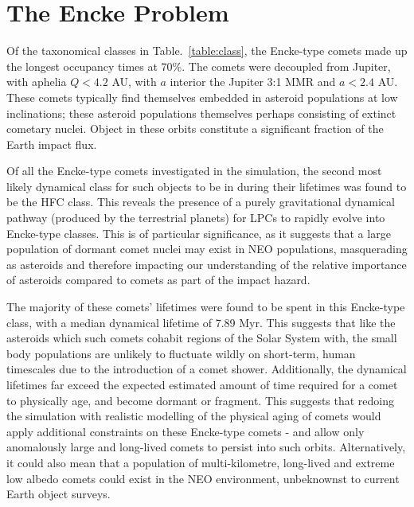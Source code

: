 \section{The Encke Problem}

Of the taxonomical classes in Table.~\ref{table:class}, the Encke-type comets made up the longest occupancy times at 70\%. The comets were decoupled from Jupiter, with aphelia $Q < 4.2$ AU, with $a$ interior the Jupiter 3:1 MMR and $a < 2.4$ AU. These comets typically find themselves embedded in asteroid populations at low inclinations; these asteroid populations themselves perhaps consisting of extinct cometary nuclei. Object in these orbits constitute a significant fraction of the Earth impact flux.

Of all the Encke-type comets investigated in the simulation, the second most likely dynamical class for such objects to be in during their lifetimes was found to be the HFC class. This reveals the presence of a purely gravitational dynamical pathway (produced by the terrestrial planets) for LPCs to rapidly evolve into Encke-type classes. This is of particular significance, as it suggests that a large population of dormant comet nuclei may exist in NEO populations, masquerading as asteroids and therefore impacting our understanding  of  the  relative  importance  of  asteroids  compared to comets as part of the impact hazard.

The majority of these comets' lifetimes were found to be spent in this Encke-type class, with a median dynamical lifetime of 7.89 Myr. This suggests that like the asteroids which such comets cohabit regions of the Solar System with, the small body populations are unlikely to fluctuate wildly on short-term, human timescales due to the introduction of a comet shower. Additionally, the dynamical lifetimes far exceed the expected estimated amount of time required for a comet to physically age, and become dormant or fragment. This suggests that redoing the simulation with realistic modelling of the physical aging of comets would apply additional constraints on these Encke-type comets -  and allow only anomalously large and long-lived comets to persist into such orbits. Alternatively, it could also mean that a population of multi-kilometre, long-lived and extreme low albedo comets could exist in the NEO environment, unbeknownst to current Earth object surveys.


